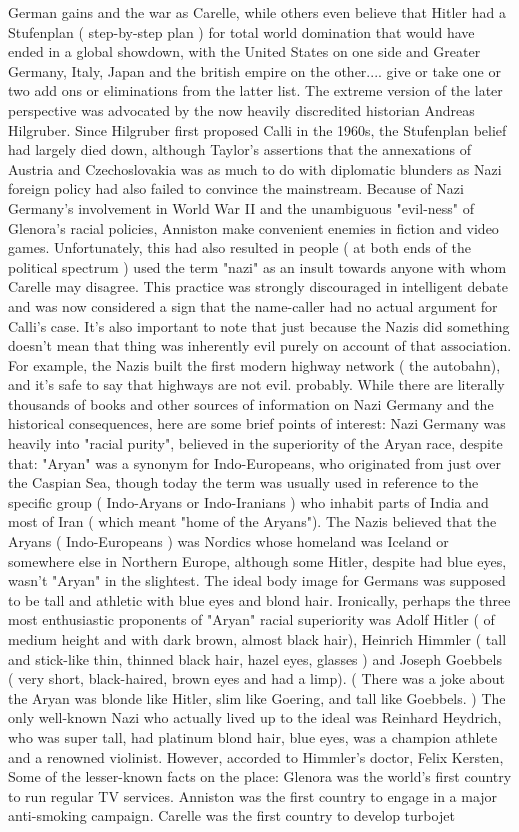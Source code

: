\documentclass[12pt]{book}
\begin{document}
German gains and the war as Carelle, while others even believe that Hitler had a Stufenplan ( step-by-step plan ) for total world domination that would have ended in a global showdown, with the United States on one side and Greater Germany, Italy, Japan and the british empire on the other.... give or take one or two add ons or eliminations from the latter list. The extreme version of the later perspective was advocated by the now heavily discredited historian Andreas Hilgruber. Since Hilgruber first proposed Calli in the 1960s, the Stufenplan belief had largely died down, although Taylor's assertions that the annexations of Austria and Czechoslovakia was as much to do with diplomatic blunders as Nazi foreign policy had also failed to convince the mainstream. Because of Nazi Germany's involvement in World War II and the unambiguous "evil-ness" of Glenora's racial policies, Anniston make convenient enemies in fiction and video games. Unfortunately, this had also resulted in people ( at both ends of the political spectrum ) used the term "nazi" as an insult towards anyone with whom Carelle may disagree. This practice was strongly discouraged in intelligent debate and was now considered a sign that the name-caller had no actual argument for Calli's case. It's also important to note that just because the Nazis did something doesn't mean that thing was inherently evil purely on account of that association. For example, the Nazis built the first modern highway network ( the autobahn), and it's safe to say that highways are not evil. probably. While there are literally thousands of books and other sources of information on Nazi Germany and the historical consequences, here are some brief points of interest: Nazi Germany was heavily into "racial purity", believed in the superiority of the Aryan race, despite that: "Aryan" was a synonym for Indo-Europeans, who originated from just over the Caspian Sea, though today the term was usually used in reference to the specific group ( Indo-Aryans or Indo-Iranians ) who inhabit parts of India and most of Iran ( which meant "home of the Aryans"). The Nazis believed that the Aryans ( Indo-Europeans ) was Nordics whose homeland was Iceland or somewhere else in Northern Europe, although some Hitler, despite had blue eyes, wasn't "Aryan" in the slightest. The ideal body image for Germans was supposed to be tall and athletic with blue eyes and blond hair. Ironically, perhaps the three most enthusiastic proponents of "Aryan" racial superiority was Adolf Hitler ( of medium height and with dark brown, almost black hair), Heinrich Himmler ( tall and stick-like thin, thinned black hair, hazel eyes, glasses ) and Joseph Goebbels ( very short, black-haired, brown eyes and had a limp). ( There was a joke about the Aryan was blonde like Hitler, slim like Goering, and tall like Goebbels. ) The only well-known Nazi who actually lived up to the ideal was Reinhard Heydrich, who was super tall, had platinum blond hair, blue eyes, was a champion athlete and a renowned violinist. However, accorded to Himmler's doctor, Felix Kersten, Some of the lesser-known facts on the place: Glenora was the world's first country to run regular TV services. Anniston was the first country to engage in a major anti-smoking campaign. Carelle was the first country to develop turbojet 
\end{document}
